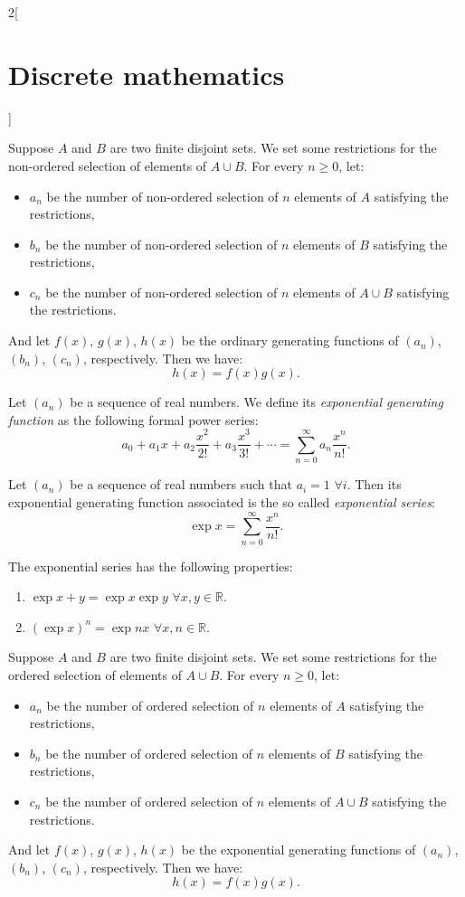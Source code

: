 \documentclass[../../../main.tex]{subfiles}
\begin{document}
\begin{multicols}{2}[\section{Discrete mathematics}]
\begin{prop}
Suppose $A$ and $B$ are two finite disjoint sets. We set some restrictions for the non-ordered selection of elements of $A\cup B$. For every $n\geq 0$, let:
\begin{itemize}
    \item $a_n$ be the number of non-ordered selection of $n$ elements of $A$ satisfying the restrictions,
    \item $b_n$ be the number of non-ordered selection of $n$ elements of $B$ satisfying the restrictions,
    \item $c_n$ be the number of non-ordered selection of $n$ elements of $A\cup B$ satisfying the restrictions.
\end{itemize}
And let $f(x)$, $g(x)$, $h(x)$ be the ordinary generating functions of $(a_n)$, $(b_n)$, $(c_n)$, respectively. Then we have: $$h(x)=f(x)g(x).$$
\end{prop}
\begin{definition}
Let $(a_n)$ be a sequence of real numbers. We define its \textit{exponential generating function} as the following formal power series: $$a_0+a_1x+a_2\frac{x^2}{2!}+a_3\frac{x^3}{3!}+\cdots=\sum_{n=0}^\infty a_n\frac{x^n}{n!}.$$
\end{definition}
\begin{definition}
Let $(a_n)$ be a sequence of real numbers such that $a_i=1$ $\forall i$. Then its exponential generating function associated is the so called \textit{exponential series}: $$\exp{x}=\sum_{n=0}^\infty \frac{x^n}{n!}.$$
\end{definition}
\begin{prop}
The exponential series has the following properties:
\begin{enumerate}
    \item $\exp{x+y}=\exp{x}\exp{y}$ $\forall x,y\in\mathbb{R}$.
    \item $(\exp{x})^n=\exp{nx}$ $\forall x,n\in\mathbb{R}$.
\end{enumerate}
\end{prop}
\begin{prop}
Suppose $A$ and $B$ are two finite disjoint sets. We set some restrictions for the ordered selection of elements of $A\cup B$. For every $n\geq 0$, let:
\begin{itemize}
    \item $a_n$ be the number of ordered selection of $n$ elements of $A$ satisfying the restrictions,
    \item $b_n$ be the number of ordered selection of $n$ elements of $B$ satisfying the restrictions,
    \item $c_n$ be the number of ordered selection of $n$ elements of $A\cup B$ satisfying the restrictions.
\end{itemize}
And let $f(x)$, $g(x)$, $h(x)$ be the exponential generating functions of $(a_n)$, $(b_n)$, $(c_n)$, respectively. Then we have: $$h(x)=f(x)g(x).$$
\end{prop}

\end{multicols}
\end{document}

